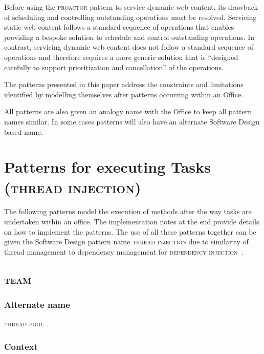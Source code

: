 \documentclass[prodmode]{style/acmlarge}
\begin{document}
Before using the \textsc{proactor} pattern to service dynamic web content, its
drawback of scheduling and controlling outstanding operations \cite[p.
8]{proactor} must be resolved.  Servicing static web content follows a standard
sequence of operations that enables providing a bespoke solution to schedule and
control outstanding operations.  In contrast, servicing dynamic web content does
not follow a standard sequence of operations and therefore requires a more
generic solution that is ``designed carefully to support prioritization and
cancellation'' \cite[p. 8]{proactor} of the operations.

The patterns presented in this paper address the constraints and limitations
identified by modelling themselves after patterns occurring within an Office.

All patterns are also given an analogy name with the Office to keep all pattern
names similar.  In some cases patterns will also have an alternate Software
Design based name.



\section{Patterns for executing Tasks (\textsc{thread injection})}

The following patterns model the execution of methods after the way tasks are
undertaken within an office.  The implementation notes at the end provide
details on how to implement the patterns.  The use of all these patterns
together can be given the Software Design pattern name \textsc{thread injection}
due to similarity of thread management to dependency management for
\textsc{dependency injection}~\cite{ioc}.

\subsection{\textsc{\textbf{team}}}

\subsubsection*{Alternate name}

\textsc{thread pool} \cite{thread-per-request}.

\subsubsection*{Context}
\end{document}
